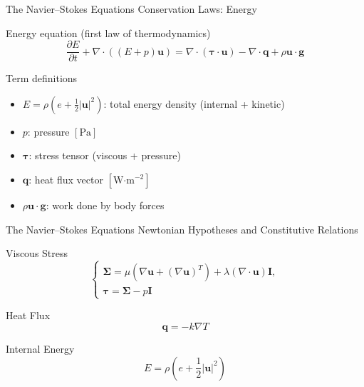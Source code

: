\begin{frame}{The Navier--Stokes Equations}
\small
\textcolor{red_unipd}{\Large Conservation Laws: Energy}

\vspace{0.8em}

\begin{alertblock}{Energy equation (first law of thermodynamics)}
\[
\dfrac{\partial E}{\partial t}
+ \nabla\!\cdot\!((E+p)\mathbf{u})
= \nabla\!\cdot\!(\boldsymbol{\tau}\!\cdot\!\mathbf{u})
- \nabla\!\cdot\!\mathbf{q}
+ \rho \mathbf{u}\!\cdot\!\mathbf{g}
\]
\end{alertblock}

\vfill

\begin{block}{Term definitions}
\begin{itemize}
  \item \(E = \rho\!\left(e + \tfrac{1}{2}|\mathbf{u}|^2\right)\): total energy density (internal + kinetic)
  \item \(p\): pressure \([\text{Pa}]\)
  \item \(\boldsymbol{\tau}\): stress tensor (viscous + pressure)
  \item \(\mathbf{q}\): heat flux vector \([\text{W·m}^{-2}]\)
  \item \(\rho \mathbf{u}\!\cdot\!\mathbf{g}\): work done by body forces
\end{itemize}
\end{block}
\end{frame}




\begin{frame}{The Navier--Stokes Equations}
\small
\textcolor{red_unipd}{\Large Newtonian Hypotheses and Constitutive Relations}

\begin{alertblock}{Viscous Stress}
\[
\begin{cases}
\boldsymbol{\Sigma} = \mu\left(\nabla \mathbf{u} + (\nabla \mathbf{u})^T\right) + \lambda (\nabla\!\cdot\!\mathbf{u}) \mathbf{I},\\[4pt]
\boldsymbol{\tau} = \boldsymbol{\Sigma} - p \mathbf{I}
\end{cases}
\]
\end{alertblock}

\begin{alertblock}{Heat Flux}
\[
\mathbf{q} = -k \nabla T
\]
\end{alertblock}

\begin{alertblock}{Internal Energy}
\[
E = \rho\left(e + \dfrac{1}{2}|\mathbf{u}|^2\right)
\]
\end{alertblock}

\end{frame}




